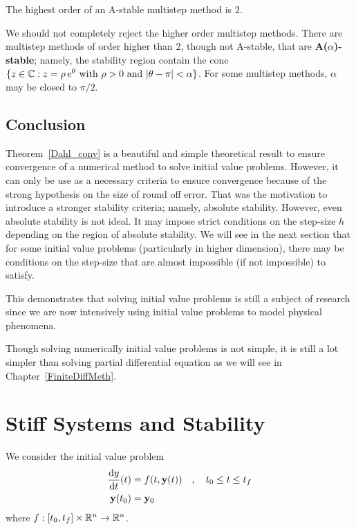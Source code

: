 \begin{theorem}
The highest order of an A-stable multistep method is $2$.
\label{Dahl2ndB}
\end{theorem}

\begin{rmk}
We should not completely reject the higher order multistep methods.
There are multistep methods of order higher than $2$, though not
A-stable, that are
{\bfseries A($\alpha$)-stable};
namely, the stability region contain the cone
$\{ z \in \mathbb{C} : z = \rho\,e^\theta \ \text{with $\rho>0$ and
$|\theta-\pi|<\alpha$} \}$.  For some multistep methods, $\alpha$ may
be closed to $\pi/2$.
\end{rmk}

\subsection{Conclusion}

Theorem~\ref{Dahl_conv} is a beautiful and simple theoretical result
to ensure convergence of a numerical method to solve initial value
problems.  However, it can only be use as a necessary criteria to
ensure convergence because of the strong hypothesis on the size of
round off error.  That was the motivation to introduce a stronger
stability criteria; namely, absolute stability.  However, even
absolute stability is not ideal.  It may impose strict conditions on
the step-size $h$ depending on the region of absolute stability.  We
will see in the next section that for some initial value problems
(particularly in higher dimension), there may be conditions on the
step-size that are almost impossible (if not impossible) to satisfy.

This demonstrates that solving initial value problems is still a
subject of research since we are now intensively using initial value
problems to model physical phenomena.

Though solving numerically initial value problems is not simple, it is
still a lot simpler than solving partial differential equation as we
will see in Chapter~\ref{FiniteDiffMeth}.

\section{Stiff Systems and Stability}

We consider the initial value problem
\begin{equation} \label{SODE}
\begin{split}
\frac{\mathrm{d}y}{\mathrm{d}{t}}(t) &= f(t,\mathbf{y}(t)) \quad , \quad t_0 \leq t \leq t_f \\
\mathbf{y}(t_0) & = \mathbf{y}_0
\end{split}
\end{equation}
where $f:[t_0,t_f]\times\mathbb{R}^n \rightarrow \mathbb{R}^n$.

